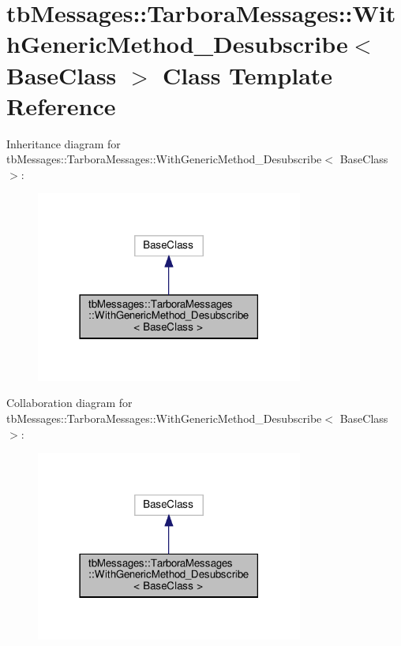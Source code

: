 \hypertarget{classtbMessages_1_1TarboraMessages_1_1WithGenericMethod__Desubscribe}{}\section{tb\+Messages\+:\+:Tarbora\+Messages\+:\+:With\+Generic\+Method\+\_\+\+Desubscribe$<$ Base\+Class $>$ Class Template Reference}
\label{classtbMessages_1_1TarboraMessages_1_1WithGenericMethod__Desubscribe}


Inheritance diagram for tb\+Messages\+:\+:Tarbora\+Messages\+:\+:With\+Generic\+Method\+\_\+\+Desubscribe$<$ Base\+Class $>$\+:
\nopagebreak
\begin{figure}[H]
\begin{center}
\leavevmode
\includegraphics[width=249pt]{classtbMessages_1_1TarboraMessages_1_1WithGenericMethod__Desubscribe__inherit__graph}
\end{center}
\end{figure}


Collaboration diagram for tb\+Messages\+:\+:Tarbora\+Messages\+:\+:With\+Generic\+Method\+\_\+\+Desubscribe$<$ Base\+Class $>$\+:
\nopagebreak
\begin{figure}[H]
\begin{center}
\leavevmode
\includegraphics[width=249pt]{classtbMessages_1_1TarboraMessages_1_1WithGenericMethod__Desubscribe__coll__graph}
\end{center}
\end{figure}
